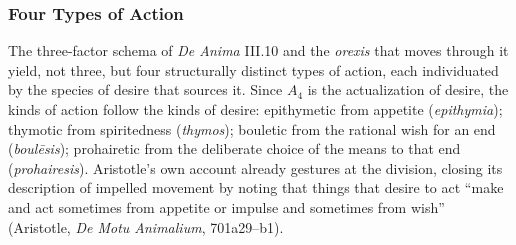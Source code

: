 %
%

\subsubsection*{Four Types of Action}

The three-factor schema of \textit{De Anima} III.10 and the \textit{orexis} that moves through it yield, not three, but four structurally distinct types of action, each individuated by the species of desire that sources it. Since $A_4$ is the actualization of desire, the kinds of action follow the kinds of desire: epithymetic from appetite (\textit{epithymia}); thymotic from spiritedness (\textit{thymos}); bouletic from the rational wish for an end (\textit{boulēsis}); prohairetic from the deliberate choice of the means to that end (\textit{prohairesis}). Aristotle's own account already gestures at the division, closing its description of impelled movement by noting that things that desire to act ``make and act sometimes from appetite or impulse and sometimes from wish'' (Aristotle, \textit{De Motu Animalium}, 701a29--b1).


